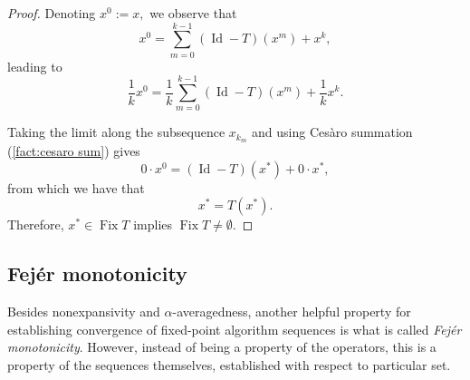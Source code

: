 \documentclass[smallextended,numbook,nospthms]{svjour3}
\theoremstyle{plain}
\theoremstyle{definition}
\DeclareMathOperator{\Id}{Id}
\DeclareMathOperator{\Fix}{Fix}
\begin{document}
\begin{proof}
Denoting $x^{0}:=x,$ we observe that
\[
x^{0}=\sum_{m=0}^{k-1}(\Id-T)\left(x^{m}\right)+x^{k},
\]
leading to
\[
\frac{1}{k} x^{0}=\frac{1}{k} \sum_{m=0}^{k-1}(\Id-T)\left(x^{m}\right)+\frac{1}{k} x^{k}.
\]

Taking the limit along the subsequence $x_{k_{m}}$ and using Cesàro summation (\cref{fact:cesaro sum}) gives
\[
0 \cdot x^{0}=(\Id-T)\left(x^{*}\right) + 0 \cdot x^{*},
\]
from which we have that
\[
x^{*}=T\left(x^{*}\right).
\]
Therefore, $x^{*} \in \Fix T$ implies $\Fix T \neq \emptyset$.
\end{proof}

\subsection{Fejér monotonicity}
Besides nonexpansivity and $\alpha$-averagedness, another helpful property for establishing convergence of fixed-point algorithm sequences is what is called \emph{Fejér monotonicity}. However, instead of being a property of the operators, this is a property of the sequences themselves, established with respect to  particular set.
\end{document}
